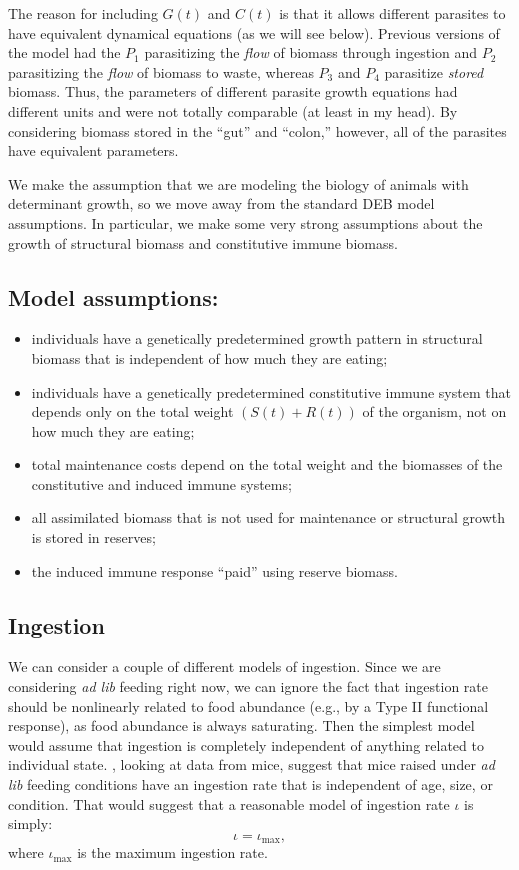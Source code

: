 \documentclass[11pt,reqno,final,pdftex]{amsart}\usepackage[]{graphicx}\usepackage[]{color}
\theoremstyle{plain}
\numberwithin{equation}{part}
\begin{document}
The reason for including $G(t)$ and $C(t)$ is that it allows different parasites to have equivalent dynamical equations (as we will see below).
Previous versions of the model had the $P_1$ parasitizing the \emph{flow} of biomass through ingestion and $P_2$ parasitizing the \emph{flow} of biomass to waste, whereas $P_3$ and $P_4$ parasitize \emph{stored} biomass.
Thus, the parameters of different parasite growth equations had different units and were not totally comparable (at least in my head).
By considering biomass stored in the ``gut'' and ``colon,'' however, all of the parasites have equivalent parameters.

We make the assumption that we are modeling the biology of animals with determinant growth, so we move away from the standard DEB model assumptions.
In particular, we make some very strong assumptions about the growth of structural biomass and constitutive immune biomass.

\subsection*{Model assumptions:}
\begin{itemize}
\item individuals have a genetically predetermined growth pattern in structural biomass that is independent of how much they are eating;
\item individuals have a genetically predetermined constitutive immune system that depends only on the total weight $(S(t)+R(t))$ of the organism, not on how much they are eating;
\item total maintenance costs depend on the total weight and the biomasses of the constitutive and induced immune systems;
\item all assimilated biomass that is not used for maintenance or structural growth is stored in reserves;
\item the induced immune response ``paid'' using reserve biomass.
\end{itemize}

\subsection*{Ingestion}
We can consider a couple of different models of ingestion.
Since we are considering \emph{ad lib} feeding right now, we can ignore the fact that ingestion rate should be nonlinearly related to food abundance (e.g., by a Type II functional response), as food abundance is always saturating.
Then the simplest model would assume that ingestion is completely independent of anything related to individual state.
\citet{vanLeeuwen2002}, looking at data from mice, suggest that mice raised under \emph{ad lib} feeding conditions have an ingestion rate that is independent of age, size, or condition.
That would suggest that a reasonable model of ingestion rate $\iota$ is simply:
\begin{equation}
\iota = \iota_{\max},
\end{equation}
where $\iota_{\max}$ is the maximum ingestion rate.
\end{document}
